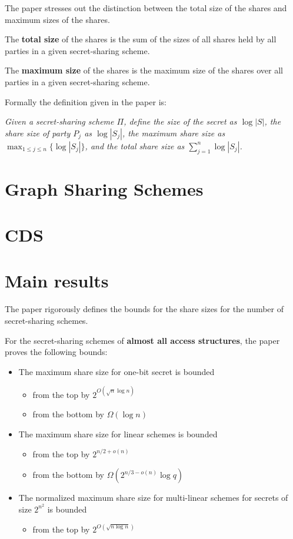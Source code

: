 The paper stresses out the distinction between the total size of the shares and maximum sizes of the shares.

The \textbf{total size} of the shares is the sum of the sizes of all shares held by all parties in a given secret-sharing scheme.

The \textbf{maximum size} of the shares is the maximum size of the shares over all parties in a given secret-sharing scheme.

Formally the definition given in the paper is:

\emph{Given a secret-sharing scheme $\Pi$,
define the \emph{size} of the secret as $\log |S|$,
the \emph{share size} of party $P_j$ as $\log |S_j|$,
the \emph{maximum share size} as $\max_{1\le j \le n} \{\log |S_j| \}$,
and the \emph{total share size} as $\sum_{j=1}^{n} \log |S_j|$.
}

\section{Graph Sharing Schemes}

\section{CDS}
\section{Main results}

The paper rigorously defines the bounds for the share sizes for the number of secret-sharing schemes.

For the secret-sharing schemes of \textbf{almost all access structures}, the paper proves the following bounds:

\begin{itemize}
    \item The maximum share size for one-bit secret is bounded 
    \begin{itemize}
        \item from the top by $2^{O(\sqrt{n}\log n)}$
        \item from the bottom by $\Omega(\log n)$
    \end{itemize}
    \item The maximum share size for linear schemes is bounded
    \begin{itemize}
        \item from the top by $2^{n/2+o(n)}$
        \item from the bottom by $\Omega(2^{n/3-o(n)}\log q)$
    \end{itemize}
    \item The normalized maximum share size for multi-linear schemes for secrets of size $2^{n^2}$ is bounded
    \begin{itemize}
        \item from the top by $2^{O(\sqrt{n \log n})}$
    \end{itemize}
\end{itemize}

